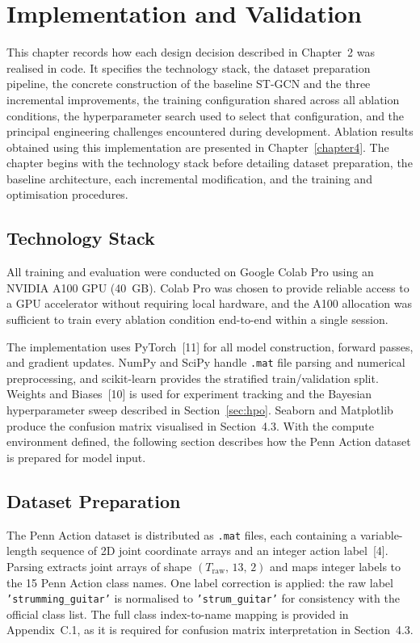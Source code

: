 \chapter{Implementation and Validation}
\label{chapter3}

This chapter records how each design decision described in Chapter~2 was realised in code. It specifies the technology stack, the dataset preparation pipeline, the concrete construction of the baseline ST-GCN and the three incremental improvements, the training configuration shared across all ablation conditions, the hyperparameter search used to select that configuration, and the principal engineering challenges encountered during development. Ablation results obtained using this implementation are presented in Chapter~\ref{chapter4}. The chapter begins with the technology stack before detailing dataset preparation, the baseline architecture, each incremental modification, and the training and optimisation procedures.

\section{Technology Stack}
\label{sec:techstack}

All training and evaluation were conducted on Google Colab Pro using an NVIDIA A100 GPU (40~GB). Colab Pro was chosen to provide reliable access to a GPU accelerator without requiring local hardware, and the A100 allocation was sufficient to train every ablation condition end-to-end within a single session.

The implementation uses PyTorch~[11] for all model construction, forward passes, and gradient updates. NumPy and SciPy handle \texttt{.mat} file parsing and numerical preprocessing, and scikit-learn provides the stratified train/validation split. Weights and Biases~[10] is used for experiment tracking and the Bayesian hyperparameter sweep described in Section~\ref{sec:hpo}. Seaborn and Matplotlib produce the confusion matrix visualised in Section~4.3. With the compute environment defined, the following section describes how the Penn Action dataset is prepared for model input.

\section{Dataset Preparation}
\label{sec:dataprep}

The Penn Action dataset is distributed as \texttt{.mat} files, each containing a variable-length sequence of 2D joint coordinate arrays and an integer action label~[4]. Parsing extracts joint arrays of shape $(T_{\text{raw}},\,13,\,2)$ and maps integer labels to the 15 Penn Action class names. One label correction is applied: the raw label \texttt{'strumming\_guitar'} is normalised to \texttt{'strum\_guitar'} for consistency with the official class list. The full class index-to-name mapping is provided in Appendix~C.1, as it is required for confusion matrix interpretation in Section~4.3.

